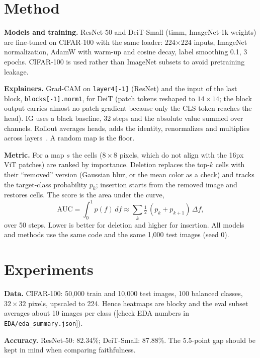 \documentclass[10pt,twocolumn]{article}
\newcommand{\todo}[1]{{\color{red}[#1]}}
\begin{document}
\section{Method}
\textbf{Models and training.} ResNet-50 and DeiT-Small (timm, ImageNet-1k weights) are fine-tuned on CIFAR-100 with the same loader: 224$\times$224 inputs, ImageNet normalization, AdamW with warm-up and cosine decay, label smoothing 0.1, 3 epochs. CIFAR-100 is used rather than ImageNet subsets to avoid pretraining leakage.

\textbf{Explainers.} Grad-CAM on \texttt{layer4[-1]} (ResNet) and the input of the last block, \texttt{blocks[-1].norm1}, for DeiT (patch tokens reshaped to $14\times14$; the block output carries almost no patch gradient because only the CLS token reaches the head). IG uses a black baseline, 32 steps and the absolute value summed over channels. Rollout averages heads, adds the identity, renormalizes and multiplies across layers~\cite{rollout}. A random map is the floor.

\textbf{Metric.} For a map $s$ the cells ($8\times8$ pixels, which do not align with the 16px ViT patches) are ranked by importance. Deletion replaces the top-$k$ cells with their ``removed'' version (Gaussian blur, or the mean color as a check) and tracks the target-class probability $p_k$; insertion starts from the removed image and restores cells. The score is the area under the curve,
\begin{equation}\label{eq:auc}
\mathrm{AUC}=\int_0^1 p(f)\,df \approx \sum_{k}\tfrac{1}{2}\,(p_{k}+p_{k+1})\,\Delta f,
\end{equation}
over 50 steps. Lower is better for deletion and higher for insertion. All models and methods use the same code and the same 1{,}000 test images (seed 0).

\section{Experiments}
\textbf{Data.} CIFAR-100: 50{,}000 train and 10{,}000 test images, 100 balanced classes, $32\times32$ pixels, upscaled to 224. Hence heatmaps are blocky and the eval subset averages about 10 images per class (\todo{check EDA numbers in \texttt{EDA/eda\_summary.json}}).

\textbf{Accuracy.} ResNet-50: 82.34\%; DeiT-Small: 87.88\%. The 5.5-point gap should be kept in mind when comparing faithfulness.
\end{document}
